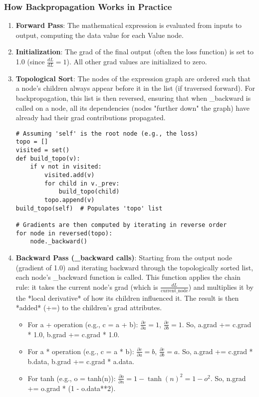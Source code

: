 \subsubsection{How Backpropagation Works in Practice} 
\begin{enumerate} 
\item \textbf{Forward Pass}: The mathematical expression is evaluated from inputs to output, computing the data value for each Value node. 
\item \textbf{Initialization}: The grad of the final output (often the loss function) is set to 1.0 (since $\frac{dL}{dL} = 1$). All other grad values are initialized to zero. 
\item \textbf{Topological Sort}: The nodes of the expression graph are ordered such that a node's children always appear before it in the list (if traversed forward). For backpropagation, this list is then reversed, ensuring that when \_backward is called on a node, all its dependencies (nodes "further down" the graph) have already had their grad contributions propagated. 

\begin{lstlisting}[caption={Topological Sort Logic (within backward method)}]
# Assuming 'self' is the root node (e.g., the loss)
topo = [] 
visited = set() 
def build_topo(v): 
    if v not in visited: 
        visited.add(v) 
        for child in v._prev: 
            build_topo(child) 
        topo.append(v) 
build_topo(self)  # Populates 'topo' list

# Gradients are then computed by iterating in reverse order
for node in reversed(topo):
    node._backward()
\end{lstlisting}

\item \textbf{Backward Pass (\_backward calls)}: Starting from the output node (gradient of 1.0) and iterating backward through the topologically sorted list, each node's \_backward function is called. This function applies the chain rule: it takes the current node's grad (which is $\frac{dL}{\text{current\_node}}$) and multiplies it by the *local derivative* of how its children influenced it. The result is then *added* (+=) to the children's grad attributes.
    \begin{itemize}
        \item For a + operation (e.g., c = a + b): $\frac{\partial c}{\partial a} = 1$, $\frac{\partial c}{\partial b} = 1$. So, a.grad += c.grad * 1.0, b.grad += c.grad * 1.0.
        \item For a * operation (e.g., c = a * b): $\frac{\partial c}{\partial a} = b$, $\frac{\partial c}{\partial b} = a$. So, a.grad += c.grad * b.data, b.grad += c.grad * a.data.
        \item For tanh (e.g., o = tanh(n)): $\frac{\partial o}{\partial n} = 1 - \tanh(n)^2 = 1 - o^2$. So, n.grad += o.grad * (1 - o.data**2).
    \end{itemize}
\end{enumerate}

